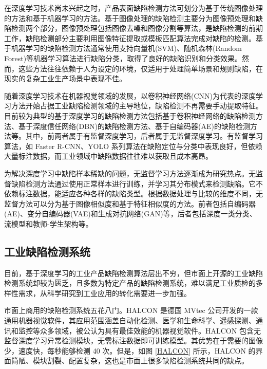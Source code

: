 \documentclass[
  ]{njuthesis}
\begin{document}
在深度学习技术尚未兴起之时，产品表面缺陷检测方法可划分为基于传统图像处理的方法和基于机器学习的方法。基于图像处理的缺陷检测主要分为图像预处理和缺陷检测两个部分，图像预处理包括图像去噪和图像分割等算法，是缺陷检测的前期工作，缺陷检测部分主要利用图像特征提取或模板匹配算法完成对缺陷的检测\cite{[4]}。基于机器学习的缺陷检测方法通常使用支持向量机(SVM)、随机森林(Random Forest)等机器学习算法进行缺陷分类，取得了良好的缺陷识别和分类效果。然而，这些方法往往依赖于人为设定的环境，仅适用于处理简单场景和规则缺陷，在现实的复杂工业生产场景中表现不佳。

随着深度学习技术在机器视觉领域的发展，以卷积神经网络(CNN)为代表的深度学习方法开始占据工业缺陷检测领域的主导地位，缺陷检测不再需要手动提取特征。目前较为典型的基于深度学习的缺陷检测方法包括基于卷积神经网络的缺陷检测方法、基于深度信任网络(DBN)的缺陷检测方法、基于自编码器(AE)的缺陷检测方法等。其中，前两者属于有监督深度学习，后者属于无监督深度学习\cite{[4]}。有监督学习算法，如 Faster R-CNN、YOLO 系列算法在缺陷定位与分类中表现良好，但依赖大量标注数据，而工业领域中缺陷数据往往难以获取且成本高昂。

为解决深度学习中缺陷样本稀缺的问题，无监督学习方法逐渐成为研究热点。无监督缺陷检测方法通过使用正常样本进行训练，并学习其分布模式来检测缺陷。它不依赖标注数据，能适应各种各样的缺陷类型。根据数据处理与比较的维度不同，无监督方法可以分为基于图像相似度和基于特征相似度的方法。前者包括自编码器(AE)、变分自编码器(VAE)和生成对抗网络(GAN)等，后者包括深度一类分类、流模型和教师-学生架构等\cite{[1]}。

\subsection{工业缺陷检测系统}

目前，基于深度学习的工业产品缺陷检测算法层出不穷，但市面上开源的工业缺陷检测系统却较为匮乏，且多数为特定产品的缺陷检测系统，难以满足工业质检的多样性需求，从科学研究到工业应用的转化需要进一步加强。

市面上商用的缺陷检测系统五花八门。HALCON 是德国 MVtec 公司开发的一款通用机器视觉软件，其应用范围涵盖自动化检测、医学和生命科学、遥感探测、通讯和监控等众多领域，被公认为具有最佳效能的机器视觉软件。HALCON 包含无监督深度学习异常检测模块，无需标注数据即可训练模型。其优势在于需要的图像少，速度快，每秒能够检测 40 次。但是，如图 \ref{HALCON} 所示，HALCON 的界面简陋、模块割裂、配置复杂，这也是市面上很多缺陷检测系统共同的缺点。
\end{document}
